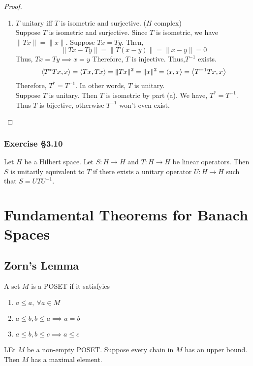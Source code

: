 \begin{proof}
\begin{enumerate}
	\hrule \vspace{1em}

	\item $T$ unitary iff $T$ is isometric and surjective. ($H$ complex)\\

		Suppose $T$ is isometric and surjective.
		Since $T$ is isometric, we have $\|Tx\| = \|x\|$.
		Suppose $Tx = Ty$.
		Then,
		\[ \|Tx-Ty\| = \|T(x-y)\| = \|x-y\| = 0 \]
		Thus, $Tx = Ty \implies x = y$
		Therefore, $T$ is injective.
		Thus,$T^{-1}$ exists.
		\[ \left\langle T^\ast Tx,x \right\rangle = \left\langle Tx,Tx \right\rangle = \|Tx\|^2 = \|x\|^2 = \left\langle x,x \right\rangle = \left\langle T^{-1}T x,x \right\rangle \]
		Therefore, $T^\ast = T^{-1}$.
		In other words, $T$ is unitary.\\

		Suppose $T$ is unitary.
		Then $T$ is isometric by part (a).
		We have, $T^\ast = T^{-1}$.
		Thus $T$ is bijective, otherwise $T^{-1}$ won't even exist.
	\end{enumerate}
\end{proof}

\subsubsection*{Exercise \S3.10}
\begin{definition}
	Let $H$ be a Hilbert space.
	Let $S : H \to H$ and $T : H \to H$ be linear operators.
	Then $S$ is unitarily equivalent to $T$ if there exists a unitary operator $U : H \to H$ such that $S = UTU^{-1}$.
\end{definition}

\section{Fundamental Theorems for Banach Spaces}
\subsection{Zorn's Lemma}
\begin{definition}[POSET]
	A set $M$ is a POSET if it satisfyies
	\begin{enumerate}
		\item $a \le a,\ \forall a \in M$
		\item $a \le b, b \le a \implies a = b$
		\item $a \le b, b \le c \implies a \le c$
	\end{enumerate}
\end{definition}
\begin{lemma}[Zorn]
	LEt $M$ be a non-empty POSET.
	Suppose every chain in $M$ has an upper bound.
	Then $M$ has a maximal element.
\end{lemma}

